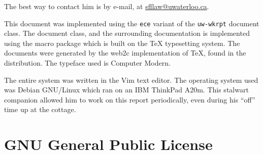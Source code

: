 \documentclass{uw-wkrpt}
\begin{document}
The best way to contact him is by e-mail, at \url{sfllaw@uwaterloo.ca}.

This document was implemented using the \texttt{ece} variant of the
\texttt{uw-wkrpt} document class.  The document class, and the 
surrounding documentation is implemented using the \LaTeXe{} macro 
package which is built on the \TeX{} typesetting system.  The documents
were generated by the web2c implementation of \TeX, found in the 
\teTeX{} distribution.  The typeface used is Computer Modern.

The entire system was written in the Vim text editor. The operating
system used was Debian GNU/Linux which ran on an IBM ThinkPad A20m. This
stalwart companion allowed him to work on this report periodically, even
during his ``off'' time up at the cottage.


\section{GNU General Public License}\label{app:gnugpl}
\renewcommand{\labelenumii}{\theenumii)}
\end{document}
